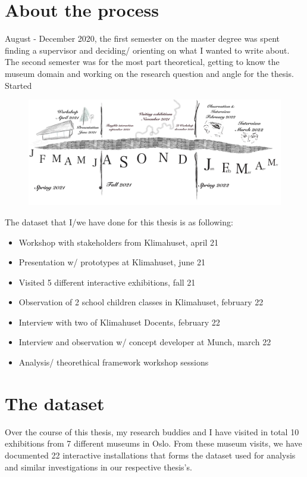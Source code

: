 \section{About the process }

August - December 2020, the first semester on the master degree was spent finding a supervisor and deciding/ orienting on what I wanted to write about. The second semester was for the most part theoretical, getting to know the museum domain and working on the research question and angle for the thesis. Started 

\begin{figure}[h]
\includegraphics[width=13cm]{pictures/timeline.jpg}
\centering 
\end{figure}


The dataset that I/we have done for this thesis is as following:
\begin{itemize}
    \item Workshop with stakeholders from Klimahuset, april 21
    \item Presentation w/ prototypes at Klimahuset, june 21
    \item Visited 5 different interactive exhibitions, fall 21
    \item Observation of 2 school children classes in Klimahuset, february 22
    \item Interview with two of Klimahuset Docents, february 22
    \item Interview and observation w/ concept developer at Munch, march 22
    \item Analysis/ theorethical framework workshop sessions
\end{itemize}

\section{The dataset}
Over the course of this thesis, my research buddies and I have visited in total 10 exhibitions from 7 different museums in Oslo. From these museum visits, we have documented 22 interactive installations that forms the dataset used for analysis and similar investigations in our respective thesis's. 

